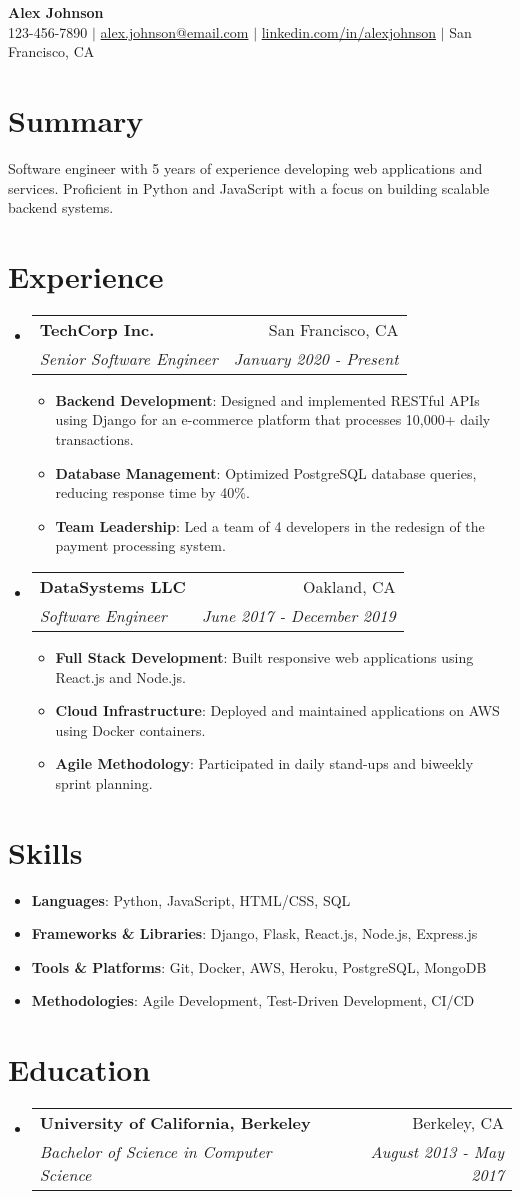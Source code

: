 \documentclass[letterpaper,10pt]{article}
\makeatletter
\newcommand{\resumeItem}[2]{
  \item\small{
    \textbf{#1}{: #2 \vspace{-2pt}}
  }
}
\newcommand{\resumeSubheading}[4]{
  \vspace{-1pt}\item
    \begin{tabular*}{0.97\textwidth}[t]{l@{\extracolsep{\fill}}r}
      \textbf{#1} & #2 \\
      \textit{\small#3} & \textit{\small #4} \\
    \end{tabular*}\vspace{-5pt}
}
\newcommand{\resumeSubItem}[2]{\resumeItem{#1}{#2}\vspace{-4pt}}
\newcommand{\resumeSubHeadingListStart}{\begin{itemize}[leftmargin=*]}
\newcommand{\resumeSubHeadingListEnd}{\end{itemize}}
\newcommand{\resumeItemListStart}{\begin{itemize}}
\newcommand{\resumeItemListEnd}{\end{itemize}\vspace{-5pt}}
\makeatother
\begin{document}
\begin{center}
    \textbf{\Huge Alex Johnson} \\ \vspace{1pt}
    \small 123-456-7890 $|$ \href{mailto:alex.johnson@email.com}{alex.johnson@email.com} $|$ 
    \href{https://linkedin.com/in/alexjohnson}{linkedin.com/in/alexjohnson} $|$
    San Francisco, CA
\end{center}

\section{Summary}
Software engineer with 5 years of experience developing web applications and services. Proficient in Python and JavaScript with a focus on building scalable backend systems.

\section{Experience}
\resumeSubHeadingListStart

\resumeSubheading
{TechCorp Inc.}{San Francisco, CA}
{Senior Software Engineer}{January 2020 - Present}
\resumeItemListStart
\resumeItem{Backend Development}{Designed and implemented RESTful APIs using Django for an e-commerce platform that processes 10,000+ daily transactions.}
\resumeItem{Database Management}{Optimized PostgreSQL database queries, reducing response time by 40\%.}
\resumeItem{Team Leadership}{Led a team of 4 developers in the redesign of the payment processing system.}
\resumeItemListEnd

\resumeSubheading
{DataSystems LLC}{Oakland, CA}
{Software Engineer}{June 2017 - December 2019}
\resumeItemListStart
\resumeItem{Full Stack Development}{Built responsive web applications using React.js and Node.js.}
\resumeItem{Cloud Infrastructure}{Deployed and maintained applications on AWS using Docker containers.}
\resumeItem{Agile Methodology}{Participated in daily stand-ups and biweekly sprint planning.}
\resumeItemListEnd

\resumeSubHeadingListEnd

\section{Skills}
\resumeSubHeadingListStart
\resumeSubItem{Languages}{Python, JavaScript, HTML/CSS, SQL}
\resumeSubItem{Frameworks \& Libraries}{Django, Flask, React.js, Node.js, Express.js}
\resumeSubItem{Tools \& Platforms}{Git, Docker, AWS, Heroku, PostgreSQL, MongoDB}
\resumeSubItem{Methodologies}{Agile Development, Test-Driven Development, CI/CD}
\resumeSubHeadingListEnd

\section{Education}
\resumeSubHeadingListStart
\resumeSubheading
{University of California, Berkeley}{Berkeley, CA}
{Bachelor of Science in Computer Science}{August 2013 - May 2017}
\resumeSubHeadingListEnd
\end{document}

